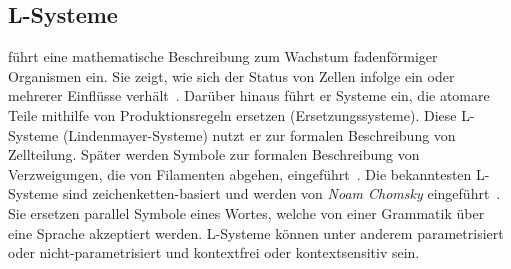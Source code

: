\subsection*{L-Systeme}
\citeauthor{lindemayer_1968} führt eine mathematische Beschreibung zum Wachstum fadenförmiger Organismen ein.
Sie zeigt, wie sich der Status von Zellen infolge ein oder mehrerer Einflüsse verhält~\cite{lindemayer_1968}.
Darüber hinaus führt er Systeme ein, die atomare Teile mithilfe von Produktionsregeln ersetzen (Ersetzungssysteme).
Diese L-Systeme (Lindenmayer-Systeme) nutzt er zur formalen Beschreibung von Zellteilung.
Später werden Symbole zur formalen Beschreibung von Verzweigungen, die von Filamenten abgehen, eingeführt~\cite{prusinkiewicz_1990}.
Die bekanntesten L-Systeme sind zeichenketten-basiert und werden von \textit{Noam Chomsky} eingeführt~\cite{chomsky_1956}.
Sie ersetzen parallel Symbole eines Wortes, welche von einer Grammatik über eine Sprache akzeptiert werden.
L-Systeme können unter anderem parametrisiert oder nicht-parametrisiert und kontextfrei oder kontextsensitiv sein.


